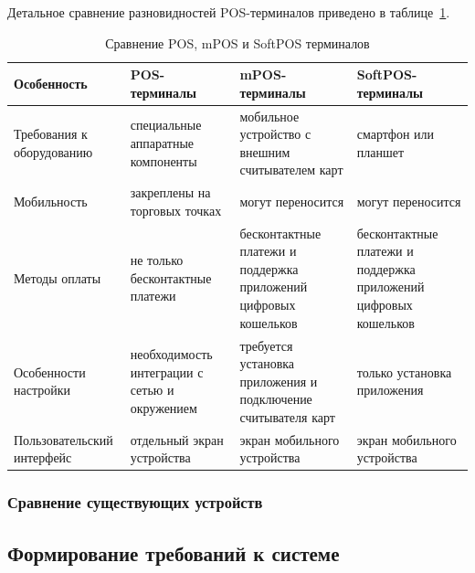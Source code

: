 Детальное сравнение разновидностей POS-терминалов приведено в таблице~\ref{tab:pos_comparison}.

\begin{table}[H]
    \caption{Сравнение POS, mPOS и SoftPOS терминалов}
    \label{tab:pos_comparison}
    \begin{sloppypar}
        \centering
        \begin{tabularx}{\textwidth}{ | >{\raggedright\arraybackslash}X | >{\raggedright\arraybackslash}X | >{\raggedright\arraybackslash}X | >{\raggedright\arraybackslash}X | }
            \hline
            \textbf{Особенность} & \textbf{POS-терминалы} & \textbf{mPOS-терминалы} & \textbf{SoftPOS-терминалы} \\
            \hline
            Требования к оборудованию & специальные аппаратные компоненты & мобильное устройство с внешним считывателем карт & смартфон или планшет \\
            \hline
            Мобильность & закреплены на торговых точках & могут переносится & могут переносится \\
            \hline
            Методы оплаты & не только бесконтактные платежи & бесконтактные платежи и поддержка приложений цифровых кошельков & бесконтактные платежи и поддержка приложений цифровых кошельков \\
            \hline
            Особенности настройки & необходимость интеграции с сетью и окружением & требуется установка приложения и подключение считывателя карт & только установка приложения \\
            \hline
            Пользовательский интерфейс & отдельный экран устройства & экран мобильного устройства & экран мобильного устройства \\
            \hline
        \end{tabularx}
    \end{sloppypar}
\end{table}


\subsubsection{Сравнение существующих устройств}




\subsection{Формирование требований к системе}


